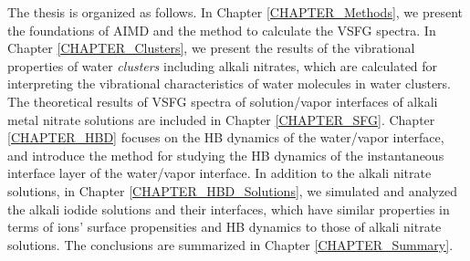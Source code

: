 The thesis is organized as follows. 
In Chapter \ref{CHAPTER_Methods}, we present the foundations of AIMD 
and the method to calculate the VSFG spectra.
In Chapter \ref{CHAPTER_Clusters}, we present the results of the vibrational properties of water \emph{clusters} including alkali nitrates, 
which are calculated for interpreting the vibrational characteristics of water molecules in water clusters.
The theoretical results of VSFG spectra of solution/vapor interfaces of alkali metal nitrate solutions are included in Chapter \ref{CHAPTER_SFG}. 
Chapter \ref{CHAPTER_HBD} focuses on the HB dynamics of the water/vapor interface, 
and introduce the method for studying the HB dynamics of the instantaneous interface layer of the water/vapor interface.
In addition to the alkali nitrate solutions, in Chapter \ref{CHAPTER_HBD_Solutions}, we simulated and analyzed the alkali iodide solutions 
and their interfaces, which have similar properties in terms of ions' surface propensities and HB dynamics to those of alkali nitrate solutions. 
The conclusions are summarized in Chapter \ref{CHAPTER_Summary}.
